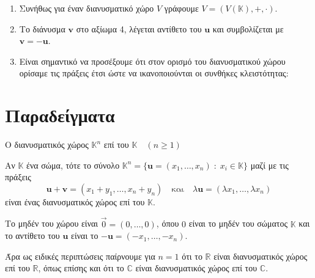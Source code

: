 \begin{rem}
\item {}
    \begin{enumerate}
        \item Συνήθως για έναν διανυσματικό χώρο $V$ γράφουμε 
            $V = (V(\mathbb{K}), +, \cdot) $.
        \item Το διάνυσμα $ \mathbf{v} $ στο αξίωμα 4, λέγεται 
            \textcolor{Col2}{αντίθετο} του $ \mathbf{u} $ και συμβολίζεται με 
            $ \mathbf{v} = - \mathbf{u} $.
        \item Είναι σημαντικό να προσέξουμε ότι στον ορισμό του διανυσματικού χώρου 
            ορίσαμε τις πράξεις έτσι ώστε να ικανοποιούνται οι συνθήκες κλειστότητας:
    \end{enumerate}
\end{rem}


\section{Παραδείγματα}


\begin{example}\label{ex:Rn}
    \textcolor{Col2}{Ο διανυσματικός χώρος $ \mathbb{K}^{n} $ 
    επί του $ \mathbb{K} \quad (n \geq 1) $}

    Αν $ \mathbb{K} $ ένα σώμα, τότε το σύνολο $ \mathbb{K}^{n} = 
    \{ \mathbf{u} = (x_{1},\ldots,x_{n}) \; : \; x_{i} \in \mathbb{K}\} $ 
    μαζί με τις πράξεις 
    \[
        \mathbf{u}+ \mathbf{v} = (x_{1}+ y_{1}, \ldots , x_{n}+y_{n}) 
        \quad \text{και} \quad \lambda \mathbf{u} = 
        ( \lambda x_{1}, \ldots, \lambda x_{n})
    \]
    είναι ένας διανυσματικός χώρος επί του $ \mathbb{K} $. 

    Το μηδέν του χώρου 
    είναι $ \vec{0} = (0,\ldots,0) $, όπου $0$ είναι το μηδέν του σώματος 
    $ \mathbb{K} $ και το αντίθετο του $ \mathbf{u} $ είναι το $ - \mathbf{u} =
    (- x_{1}, \ldots, - x_{n}) $.

    Άρα ως ειδικές περιπτώσεις παίρνουμε για $ n=1 $ ότι το $ \mathbb{R} $ 
    είναι διανυσματικός χώρος επί του $ \mathbb{R} $, όπως επίσης και ότι το 
    $ \mathbb{C} $ είναι διανυσματικός χώρος επί του $ \mathbb{C} $.
\end{example} 


